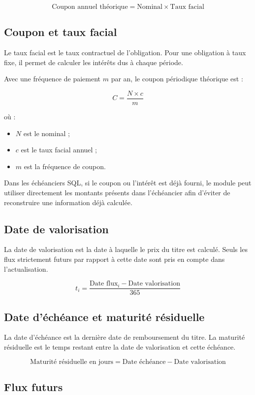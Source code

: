 \documentclass[12pt,a4paper]{article}
\begin{document}
\[
\text{Coupon annuel théorique} = \text{Nominal} \times \text{Taux facial}
\]

\subsection{Coupon et taux facial}

Le taux facial est le taux contractuel de l'obligation. Pour une obligation à taux fixe, il permet de calculer les intérêts dus à chaque période.

Avec une fréquence de paiement $m$ par an, le coupon périodique théorique est :

\[
C = \frac{N \times c}{m}
\]

où :

\begin{itemize}
    \item $N$ est le nominal ;
    \item $c$ est le taux facial annuel ;
    \item $m$ est la fréquence de coupon.
\end{itemize}

Dans les échéanciers SQL, si le coupon ou l'intérêt est déjà fourni, le module peut utiliser directement les montants présents dans l'échéancier afin d'éviter de reconstruire une information déjà calculée.

\subsection{Date de valorisation}

La date de valorisation est la date à laquelle le prix du titre est calculé. Seuls les flux strictement futurs par rapport à cette date sont pris en compte dans l'actualisation.

\[
t_i = \frac{\text{Date flux}_i - \text{Date valorisation}}{365}
\]

\subsection{Date d'échéance et maturité résiduelle}

La date d'échéance est la dernière date de remboursement du titre. La maturité résiduelle est le temps restant entre la date de valorisation et cette échéance.

\[
\text{Maturité résiduelle en jours} =
\text{Date échéance} - \text{Date valorisation}
\]

\subsection{Flux futurs}
\end{document}
